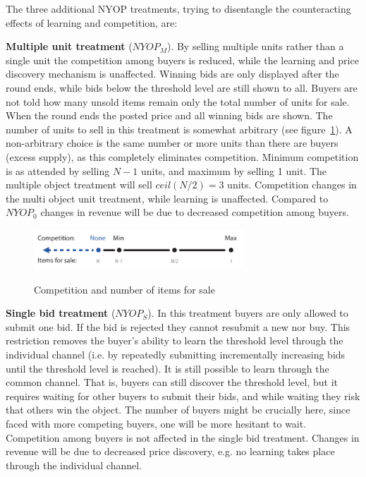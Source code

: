 \documentclass[a4paper,12pt]{article}
\begin{document}
	The three additional NYOP treatments, trying to disentangle the counteracting effects of learning and competition, are:

	{\bf Multiple unit treatment} ($NYOP_M$). 
	By selling multiple units rather than a single unit the competition among buyers is reduced, while the learning and price discovery mechanism is unaffected. Winning bids are only displayed after the round ends, while bids below the threshold level are still shown to all. Buyers are not told how many unsold items remain only the total number of units for sale. When the round ends the posted price and all winning bids are shown. The number of units to sell in this treatment is somewhat arbitrary (see figure~\ref{fig:competition-items}). A non-arbitrary choice is the same number or more units than there are buyers (excess supply), as this completely eliminates competition. Minimum competition is as attended by selling $N-1$ units, and maximum by selling 1 unit. The multiple object treatment will sell $ceil(N/2)=3$ units. Competition changes in the multi object unit treatment, while learning is unaffected. Compared to $NYOP_0$ changes in revenue will be due to decreased competition among buyers.
	
	\begin{figure}[h]
	        \centering
	        \caption{Competition and number of items for sale}
	        \includegraphics[width=0.7\textwidth]{Figures/Competition-Items}
			\label{fig:competition-items}
	\end{figure}

	{\bf Single bid treatment} ($NYOP_S$).
	In this treatment buyers are only allowed to submit one bid. If the bid is rejected they cannot resubmit a new nor buy. This restriction removes the buyer's ability to learn the threshold level through the individual channel (i.e. by repeatedly submitting incrementally increasing bids until the threshold level is reached). It is still possible to learn through the common channel. That is, buyers can still discover the threshold level, but it requires waiting for other buyers to submit their bids, and while waiting they risk that others win the object. The number of buyers might be crucially here, since faced with more competing buyers, one will be more hesitant to wait. Competition among buyers is not affected in the single bid treatment. Changes in revenue will be due to decreased price discovery, e.g. no learning takes place through the individual channel.
\end{document}
